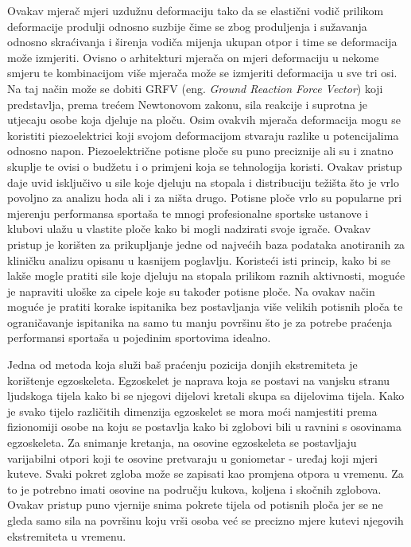 \documentclass[times, utf8, diplomski]{fer}
\begin{document}
Ovakav mjerač mjeri uzdužnu deformaciju tako da se elastični vodič prilikom deformacije produlji odnosno suzbije
čime se zbog produljenja i sužavanja odnosno skraćivanja i širenja vodiča mijenja ukupan otpor i time se deformacija može izmjeriti.
Ovisno o arhitekturi mjerača on mjeri deformaciju u nekome smjeru te kombinacijom više mjerača može se izmjeriti deformacija
u sve tri osi. Na taj način može se dobiti GRFV (eng. \textit{Ground Reaction Force Vector}) koji predstavlja, prema trećem Newtonovom zakonu,
sila reakcije i suprotna je utjecaju osobe koja djeluje na ploču. Osim ovakvih mjerača deformacija mogu se koristiti piezoelektrici
koji svojom deformacijom stvaraju razlike u potencijalima odnosno napon. Piezoelektrične potisne ploče su puno preciznije ali su
i znatno skuplje te ovisi o budžetu i o primjeni koja se tehnologija koristi. Ovakav pristup daje uvid isključivo u sile koje
djeluju na stopala i distribuciju težišta što je vrlo povoljno za analizu hoda ali i za ništa drugo. Potisne ploče vrlo su popularne
pri mjerenju performansa sportaša te mnogi profesionalne sportske ustanove i klubovi ulažu u vlastite ploče kako bi mogli nadzirati
svoje igrače. Ovakav pristup je korišten za prikupljanje jedne od najvećih baza podataka anotiranih za kliničku analizu \citep{pressurePlate}
opisanu u kasnijem poglavlju. Koristeći isti princip, kako bi se lakše mogle pratiti sile koje djeluju na stopala prilikom
raznih aktivnosti, moguće je napraviti uloške za cipele koje su također potisne ploče. Na ovakav način moguće je pratiti korake
ispitanika bez postavljanja više velikih potisnih ploča te ograničavanje ispitanika na samo tu manju površinu što je za potrebe
praćenja performansi sportaša u pojedinim sportovima idealno.

Jedna od metoda koja služi baš praćenju pozicija donjih ekstremiteta je korištenje egzoskeleta. Egzoskelet je naprava koja se
postavi na vanjsku stranu ljudskoga tijela kako bi se njegovi dijelovi kretali skupa sa dijelovima tijela. Kako je svako tijelo
različitih dimenzija egzoskelet se mora moći namjestiti prema fizionomiji osobe na koju se postavlja kako bi zglobovi bili u
ravnini s osovinama egzoskeleta. Za snimanje kretanja, na osovine egzoskeleta se postavljaju varijabilni otpori koji te osovine
pretvaraju u goniometar - uređaj koji mjeri kuteve. Svaki pokret zgloba može se zapisati kao promjena otpora u vremenu. Za to je
potrebno imati osovine na području kukova, koljena i skočnih zglobova. Ovakav pristup puno vjernije snima pokrete tijela od potisnih
ploča jer se ne gleda samo sila na površinu koju vrši osoba već se precizno mjere kutevi njegovih ekstremiteta u vremenu. 
\end{document}
